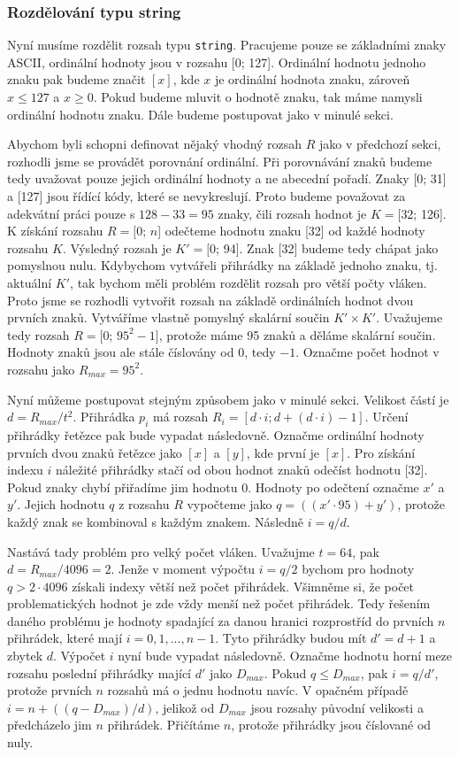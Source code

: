 \subsubsection{Rozdělování typu string}

Nyní musíme rozdělit rozsah typu \texttt{string}.
Pracujeme pouze se základními znaky ASCII, ordinální hodnoty jsou v rozsahu [0; 127].
Ordinální hodnotu jednoho znaku pak budeme značit $[x]$, kde $x$ je ordinální hodnota znaku, zároveň $x\leq 127$ a $x\geq 0$.
Pokud budeme mluvit o hodnotě znaku, tak máme namysli ordinální hodnotu znaku.
Dále budeme postupovat jako v minulé sekci.

Abychom byli schopni definovat nějaký vhodný rozsah $R$ jako v předchozí sekci, rozhodli jsme se provádět porovnání ordinální.
Při porovnávání znaků budeme tedy uvažovat pouze jejich ordinální hodnoty a ne abecední pořadí.
Znaky [0; 31] a [127] jsou řídící kódy, které se nevykreslují.
Proto budeme považovat za adekvátní práci pouze s $128-33=95$ znaky, čili rozsah hodnot je $K=[$32; 126].
K získání rozsahu $R=[$0; $n$] odečteme hodnotu znaku [32] od každé hodnoty rozsahu $K$.
Výsledný rozsah je  $K'=[$0; 94].
Znak [32] budeme tedy chápat jako pomyslnou nulu.
Kdybychom vytvářeli přihrádky na základě jednoho znaku, tj. aktuální $K'$, tak bychom měli problém rozdělit rozsah pro větší počty vláken.
Proto jsme se rozhodli vytvořit rozsah na základě ordinálních hodnot dvou prvních znaků.
Vytváříme vlastně pomyslný skalární součin $K' \times K'$.
Uvažujeme tedy rozsah $R=[$0; $95^2-1]$, protože máme 95 znaků a děláme skalární součin.
Hodnoty znaků jsou ale stále číslovány od 0, tedy $-1$.
Označme počet hodnot v rozsahu jako $R_{max}=95^2$.

Nyní můžeme postupovat stejným způsobem jako v minulé sekci.
Velikost částí je $d=R_{max}/t^2$.
Přihrádka $p_i$ má rozsah $R_i=[d \cdot i; d+(d \cdot i)-1]$.
Určení přihrádky řetězce pak bude vypadat následovně.
Označme ordinální hodnoty prvních dvou znaků řetězce jako $[x]$ a $[y]$, kde první je $[x]$.
Pro získání indexu $i$ náležité přihrádky stačí od obou hodnot znaků odečíst hodnotu [32].
Pokud znaky chybí přiřadíme jim hodnotu 0.  
Hodnoty po odečtení označme $x'$ a $y'$.
Jejich hodnotu $q$ z rozsahu $R$ vypočteme jako $q=((x' \cdot 95)+y')$, protože každý znak se kombinoval s každým znakem.
Následně $i=q/d$.

Nastává tady problém pro velký počet vláken.
Uvažujme $t=64$, pak $d=R_{max}/4096=2$.
Jenže v moment výpočtu $i=q/2$ bychom pro hodnoty $q>2 \cdot 4096$ získali indexy větší než počet přihrádek.  
Všimněme si, že počet problematických hodnot je zde vždy menší než počet přihrádek.
Tedy řešením daného problému je hodnoty spadající za danou hranici rozprostříd do prvních $n$ přihrádek, které mají $i=0, 1, ..., n-1$.
Tyto přihrádky budou mít $d'=d+1$ a zbytek $d$.
Výpočet $i$ nyní bude vypadat následovně.
Označme hodnotu horní meze rozsahu poslední přihrádky mající $d'$ jako $D_{max}$.
Pokud $q\leq D_{max}$, pak $i=q/d'$, protože prvních $n$ rozsahů má o jednu hodnotu navíc.
V opačném případě $i=n+((q-D_{max})/d)$, jelikož od $D_{max}$ jsou rozsahy původní velikosti a předcházelo jim $n$ přihrádek.
Přičítáme $n$, protože přihrádky jsou číslované od nuly.

